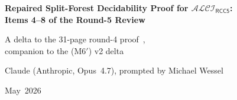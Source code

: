 \documentclass[11pt]{article}
\theoremstyle{definition}
\theoremstyle{remark}
\newcommand{\ALCIRCC}[1]{\mathcal{ALCI}_{\mathsf{RCC#1}}}
\begin{document}
\begin{center}
{\LARGE\bfseries Repaired Split-Forest Decidability Proof for $\ALCIRCC{5}$:\\[2pt]
Items 4--8 of the Round-5 Review\par}
\vspace{0.5em}
{\large A delta to the 31-page round-4 proof~\cite{GPT55Repaired},\\
companion to the (M6$'$) v2 delta~\cite{V2Delta}\par}
\vspace{0.75em}
{\normalsize Claude (Anthropic, Opus~4.7), prompted by Michael Wessel}\par
\vspace{0.45em}
{\small May~2026}
\end{center}

\begin{center}
\end{center}
\end{document}
